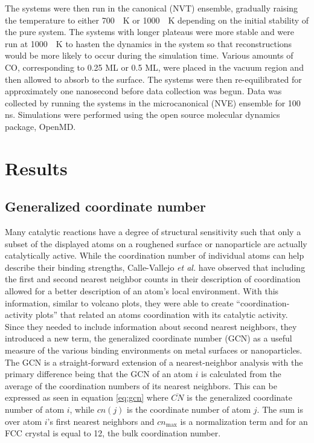 The systems were then run in the canonical (NVT) ensemble, gradually raising
the temperature to either 700\ ~K or 1000\ ~K depending on the initial
stability of the pure system.  The systems with longer plateaus were more
stable and were run at 1000\ ~K to hasten the dynamics in the system so that
reconstructions would be more likely to occur during the simulation time.
Various amounts of CO, corresponding to 0.25 ML or 0.5 ML, were placed in the
vacuum region and then allowed to absorb to the surface. The systems were then
re-equilibrated for approximately one nanosecond before data collection was
begun.  Data was collected by running the systems in the microcanonical (NVE)
ensemble for 100 ns.  Simulations were performed using the open source
molecular dynamics package, OpenMD.\citep{Fennell:2006xq, Meineke:2005pt,
openmd} 

\section{Results}




\subsection{Generalized coordinate number}
Many catalytic reactions have a degree of structural sensitivity such that only
a subset of the displayed atoms on a roughened surface or nanoparticle are
actually catalytically active. While the coordination number of individual
atoms can help describe their binding strengths, Calle-Vallejo {\it et al.}
have observed that including the first and second nearest neighbor counts in
their description of coordination allowed for a better description of an atom's
local environment.\citep{Calle-Vallejo:2015qq} With this information, similar to
volcano plots, they were able to create ``coordination-activity plots'' that
related an atoms coordination with its catalytic activity. Since they needed to
include information about second nearest neighbors, they introduced a new term,
the generalized coordinate number (GCN) as a useful measure of the various
binding environments on metal surfaces or nanoparticles. The GCN is a
straight-forward extension of a nearest-neighbor analysis with the primary
difference being that the GCN of an atom $i$ is calculated from the average of
the coordination numbers of its nearest neighbors. This can be expressed as
seen in equation \ref{eq:gcn} where $\overline{CN}$ is the generalized
coordinate number of atom $i$, while $cn(j)$ is the coordinate number of atom
$j$. The sum is over atom $i$'s first nearest neighbors and $cn_\textrm{max}$
is a normalization term and for an FCC crystal is equal to 12, the bulk
coordination number.

